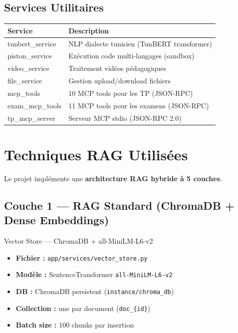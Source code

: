 \documentclass[12pt,a4paper]{article}
\begin{document}
\subsection{Services Utilitaires}

\begin{longtable}{lp{9cm}}
\toprule
\textbf{Service} & \textbf{Description} \\
\midrule
tunbert\_service & NLP dialecte tunisien (TunBERT transformer) \\
piston\_service & Exécution code multi-langages (sandbox) \\
video\_service & Traitement vidéos pédagogiques \\
file\_service & Gestion upload/download fichiers \\
mcp\_tools & 10 MCP tools pour les TP (JSON-RPC) \\
exam\_mcp\_tools & 11 MCP tools pour les examens (JSON-RPC) \\
tp\_mcp\_server & Serveur MCP stdio (JSON-RPC 2.0) \\
\bottomrule
\end{longtable}

\section{Techniques RAG Utilisées}

Le projet implémente une \textbf{architecture RAG hybride à 5 couches}.

\subsection{Couche 1 --- RAG Standard (ChromaDB + Dense Embeddings)}

\begin{agentbox}{Vector Store --- ChromaDB + all-MiniLM-L6-v2}
\begin{itemize}[noitemsep]
  \item \textbf{Fichier :} \texttt{app/services/vector\_store.py}
  \item \textbf{Modèle :} SentenceTransformer \texttt{all-MiniLM-L6-v2}
  \item \textbf{DB :} ChromaDB persistent (\texttt{instance/chroma\_db})
  \item \textbf{Collection :} une par document (\texttt{doc\_\{id\}})
  \item \textbf{Batch size :} 100 chunks par insertion
\end{itemize}
\end{agentbox}
\end{document}
